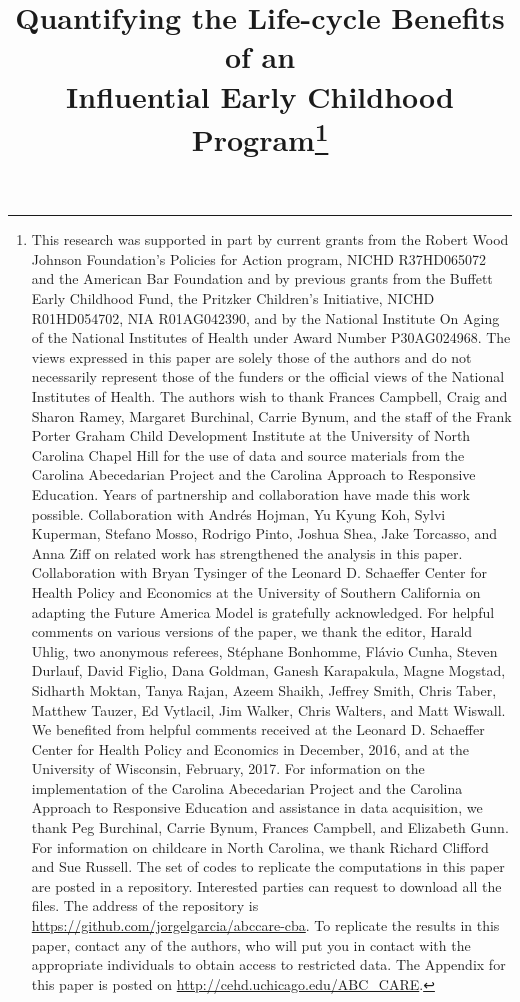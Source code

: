 \begin{titlepage}
\title{\Large \textbf{Quantifying the Life-cycle Benefits of an \\ Influential Early Childhood Program}\thanks{This research was supported in part by current grants from the Robert Wood Johnson Foundation's Policies for Action program, NICHD R37HD065072 and the American Bar Foundation and by previous grants from the Buffett Early Childhood Fund, the Pritzker Children's Initiative, NICHD R01HD054702, NIA R01AG042390, and by the National Institute On Aging of the National Institutes of Health under Award Number P30AG024968. The views expressed in this paper are solely those of the authors and do not necessarily represent those of the funders or the official views of the National Institutes of Health. The authors wish to thank Frances Campbell, Craig and Sharon Ramey, Margaret Burchinal, Carrie Bynum, and the staff of the Frank Porter Graham Child Development Institute at the University of North Carolina Chapel Hill for the use of data and source materials from the Carolina Abecedarian Project and the Carolina Approach to Responsive Education. Years of partnership and collaboration have made this work possible. Collaboration with Andr\'{e}s Hojman, Yu Kyung Koh, Sylvi Kuperman, Stefano Mosso, Rodrigo Pinto, Joshua Shea, Jake Torcasso, and Anna Ziff on related work has strengthened the analysis in this paper. Collaboration with Bryan Tysinger of the Leonard D. Schaeffer Center for Health Policy and Economics at the University of Southern California on adapting the Future America Model is gratefully acknowledged. For helpful comments on various versions of the paper, we thank the editor, Harald Uhlig, two anonymous referees, St\'{e}phane Bonhomme, Fl\'{a}vio Cunha, Steven Durlauf, David Figlio, Dana Goldman, Ganesh Karapakula, Magne Mogstad, Sidharth Moktan, Tanya Rajan, Azeem Shaikh, Jeffrey Smith, Chris Taber, Matthew Tauzer, Ed Vytlacil, Jim Walker, Chris Walters, and Matt Wiswall. We benefited from helpful comments received at the Leonard D. Schaeffer Center for Health Policy and Economics in December, 2016, and at the University of Wisconsin, February, 2017. For information on the implementation of the Carolina Abecedarian Project and the Carolina Approach to Responsive Education and assistance in data acquisition, we thank Peg Burchinal, Carrie Bynum, Frances Campbell, and Elizabeth Gunn. For information on childcare in North Carolina, we thank Richard Clifford and Sue Russell. The set of codes to replicate the computations in this paper are posted in a repository. Interested parties can request to download all the files. The address of the repository is \url{https://github.com/jorgelgarcia/abccare-cba}. To replicate the results in this paper, contact any of the authors, who will put you in contact with the appropriate individuals to obtain access to restricted data. The Appendix for this paper is posted on \url{http://cehd.uchicago.edu/ABC_CARE}.}}


\end{titlepage}
